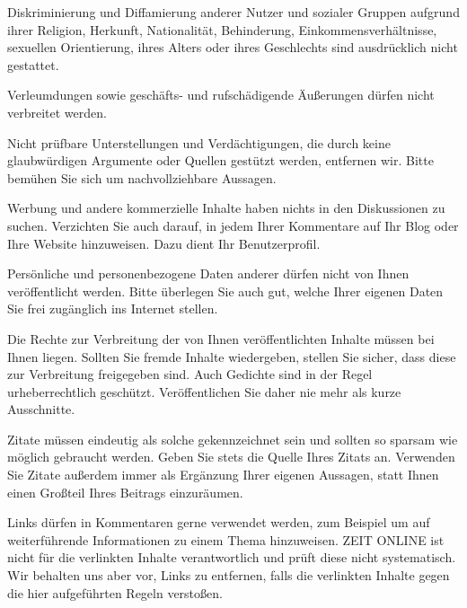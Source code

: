 Diskriminierung und Diffamierung anderer Nutzer und sozialer Gruppen aufgrund ihrer Religion, Herkunft, Nationalität, Behinderung, Einkommensverhältnisse, sexuellen Orientierung, ihres Alters oder ihres Geschlechts sind ausdrücklich nicht gestattet.

Verleumdungen sowie geschäfts- und rufschädigende Äußerungen dürfen nicht verbreitet werden.

Nicht prüfbare Unterstellungen und Verdächtigungen, die durch keine glaubwürdigen Argumente oder Quellen gestützt werden, entfernen wir. Bitte bemühen Sie sich um nachvollziehbare Aussagen.

Werbung und andere kommerzielle Inhalte haben nichts in den Diskussionen zu suchen. Verzichten Sie auch darauf, in jedem Ihrer Kommentare auf Ihr Blog oder Ihre Website hinzuweisen. Dazu dient Ihr Benutzerprofil.

Persönliche und personenbezogene Daten anderer dürfen nicht von Ihnen veröffentlicht werden. Bitte überlegen Sie auch gut, welche Ihrer eigenen Daten Sie frei zugänglich ins Internet stellen.

Die Rechte zur Verbreitung der von Ihnen veröffentlichten Inhalte müssen bei Ihnen liegen. Sollten Sie fremde Inhalte wiedergeben, stellen Sie sicher, dass diese zur Verbreitung freigegeben sind. Auch Gedichte sind in der Regel urheberrechtlich geschützt. Veröffentlichen Sie daher nie mehr als kurze Ausschnitte.

Zitate müssen eindeutig als solche gekennzeichnet sein und sollten so sparsam wie möglich gebraucht werden. Geben Sie stets die Quelle Ihres Zitats an. Verwenden Sie Zitate außerdem immer als Ergänzung Ihrer eigenen Aussagen, statt Ihnen einen Großteil Ihres Beitrags einzuräumen.

Links dürfen in Kommentaren gerne verwendet werden, zum Beispiel um auf weiterführende Informationen zu einem Thema hinzuweisen. ZEIT ONLINE ist nicht für die verlinkten Inhalte verantwortlich und prüft diese nicht systematisch. Wir behalten uns aber vor, Links zu entfernen, falls die verlinkten Inhalte gegen die hier aufgeführten Regeln verstoßen.